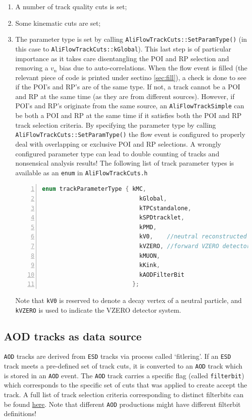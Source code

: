 \documentclass[a4paper]{book}
\numberwithin{equation}{subsection}
\begin{document}
\begin{enumerate}
\item A number of track quality cuts is set;
\item Some kinematic cuts are set;
\item The parameter type is set by calling \texttt{AliFlowTrackCuts::SetParamType()} (in this case to \texttt{AliFlowTrackCuts::kGlobal}). This last step is of particular importance as it takes care disentangling the POI and RP selection and removing a $v_n$ bias due to auto-correlations. When the flow event is filled (the relevant piece of code is printed under sectino \ref{sec:fill}), a check is done to see if the POI's and RP's are of the same type. If not, a track cannot be a POI and RP at the same time (as they are from different sources). However, if POI's and RP's originate from the same source, an \texttt{AliFlowTrackSimple} can be both a POI and RP at the same time if it satisfies both the POI and RP track selection criteria. By specifying the parameter type by calling \texttt{AliFlowTrackCuts::SetParamType()} the flow event is configured to properly deal with overlapping or exclusive POI and RP selections. A wrongly configured parameter type can lead to double counting of tracks and nonsensical analysis results! The following list of track parameter types is available as an \texttt{enum} in \texttt{AliFlowTrackCuts.h}
\begin{lstlisting}[language=C, numbers=left]
  enum trackParameterType { kMC, 
                            kGlobal, 
                            kTPCstandalone, 
                            kSPDtracklet,
                            kPMD,
                            kV0,    //neutral reconstructed v0 particle
                            kVZERO, //forward VZERO detector
                            kMUON,
                            kKink,
                            kAODFilterBit
                          };\end{lstlisting}
Note that \texttt{kV0} is reserved to denote a decay vertex of a neutral particle, and \texttt{kVZERO} is used to indicate the VZERO detector system.
\end{enumerate}

\subsection{AOD tracks as data source}
\texttt{AOD} tracks are derived from \texttt{ESD} tracks via process called `fitlering'. If an \texttt{ESD} track meets a pre-defined set of track cuts, it is converted to an \texttt{AOD} track which is stored in an \texttt{AOD} event. The \texttt{AOD} track carries a specific flag (called \texttt{filterbit}) which corresponds to the specific set of cuts that was applied to create accept the track. A full list of track selection criteria corresponding to distinct filterbits can be found \href{}{here}. Note that different \texttt{AOD} productions might have different filterbit definitions!
\end{document}
